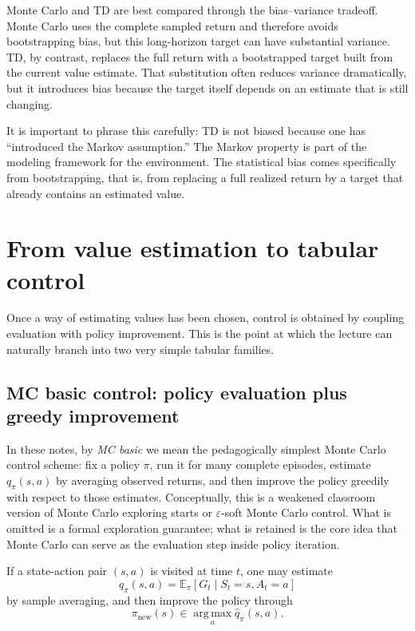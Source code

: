 \documentclass[11pt]{article}
\newcommand{\E}{\mathbb{E}}
\newcommand{\1}{\mathbf{1}}
\newcommand{\argmax}{\operatorname*{arg\,max}}
\newcommand{\eps}{\varepsilon}
\begin{document}
Monte Carlo and TD are best compared through the bias--variance tradeoff. Monte Carlo uses the complete sampled return and therefore avoids bootstrapping bias, but this long-horizon target can have substantial variance. TD, by contrast, replaces the full return with a bootstrapped target built from the current value estimate. That substitution often reduces variance dramatically, but it introduces bias because the target itself depends on an estimate that is still changing.

It is important to phrase this carefully: TD is not biased because one has ``introduced the Markov assumption.'' The Markov property is part of the modeling framework for the environment. The statistical bias comes specifically from bootstrapping, that is, from replacing a full realized return by a target that already contains an estimated value.

\section{From value estimation to tabular control}

Once a way of estimating values has been chosen, control is obtained by coupling evaluation with policy improvement. This is the point at which the lecture can naturally branch into two very simple tabular families.

\subsection{MC basic control: policy evaluation plus greedy improvement}

In these notes, by \emph{MC basic} we mean the pedagogically simplest Monte Carlo control scheme: fix a policy $\pi$, run it for many complete episodes, estimate $q_\pi(s,a)$ by averaging observed returns, and then improve the policy greedily with respect to those estimates. Conceptually, this is a weakened classroom version of Monte Carlo exploring starts or $\eps$-soft Monte Carlo control. What is omitted is a formal exploration guarantee; what is retained is the core idea that Monte Carlo can serve as the evaluation step inside policy iteration.

If a state-action pair $(s,a)$ is visited at time $t$, one may estimate
\begin{equation}
q_\pi(s,a)=\E_\pi[G_t\mid S_t=s,A_t=a]
\end{equation}
by sample averaging, and then improve the policy through
\begin{equation}
\pi_{\mathrm{new}}(s) \in \argmax_a \hat q_\pi(s,a).
\end{equation}
\end{document}
